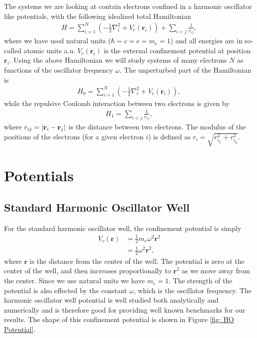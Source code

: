 \documentclass[../main.tex]{subfiles}
\begin{document}
The systems we are looking at contain electrons confined in a harmonic oscillator like potentials, with the following idealized total Hamiltonian
\begin{align}\label{eq: finalH}
    H=\sum_{i=1}^{N} \left(  -\frac{1}{2} \nabla_i^2 + V_c(\mathbf{r}_i)  \right)+\sum_{i<j}\frac{1}{r_{ij}},
\end{align}
where we have used natural units ($\hbar=c=e=m_e=1$) and all energies are in so-called atomic units a.u. $V_c(\mathbf{r}_i)$ is the external confinement potential at position $\mathbf{r}_i$. Using the above Hamiltonian we will study systems of many electrons $N$ as functions of the oscillator frequency  $\omega$. The unperturbed part of the Hamiltonian is
\begin{align}
    H_0=\sum_{i=1}^{N} \left(  -\frac{1}{2} \nabla_i^2 + V_c(\mathbf{r}_i)  \right),
\end{align}
while the repulsive Coulomb interaction between two electrons is given by
\begin{align}
    H_1=\sum_{i<j}\frac{1}{r_{ij}},
\end{align}
where $r_{ij}=\vert {\bf r}_i-{\bf r}_j\vert$ is the distance between two electrons. The modulus of the positions of the electrons (for a given electron $i$) is defined as $r_i = \sqrt{r_{i_x}^2+r_{i_y}^2}$.



\section{Potentials}

\subsection{Standard Harmonic Oscillator Well}

For the standard harmonic oscillator well, the confinement potential is simply\cite{Griffiths}
\begin{equation}\label{eq: HO Potential}
\begin{split}
    V_c(\mathbf{r}) &= \frac{1}{2}m_e\omega^2 \mathbf{r}^2\\
    &=\frac{1}{2}\omega^2 \mathbf{r}^2,
\end{split}
\end{equation}
where $\mathbf{r}$ is the distance from the center of the well. The potential is zero at the center of the well, and then increases proportionally to $\mathbf{r}^2$ as we move away from the center. Since we use natural units we have $m_e=1$. The strength of the potential is also effected by the constant $\omega$, which is the oscillator frequency. The harmonic oscillator well potential is well studied both analytically and numerically and is therefore good for providing well known benchmarks for our results. The shape of this confinement potential is shown in Figure \ref{fig: HO Potential}.
\end{document}
